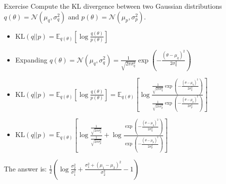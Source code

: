 \documentclass{beamer}
\begin{document}
\begin{frame}{Exercise}
    Compute the KL divergence between two Gaussian distributions $q(\theta) = \mathcal{N}(\mu_q, \sigma_q^2)$ and $p(\theta) = \mathcal{N}(\mu_p, \sigma_p^2)$.

    \begin{itemize}
        \item \pause $\text{KL}(q||p) = \mathbb{E}_{q(\theta)} \left[ \log \frac{q(\theta)}{p(\theta)} \right]$
        \item \pause Expanding $q(\theta) = \mathcal{N}(\mu_q, \sigma_q^2) = \frac{1}{\sqrt{2\pi\sigma_q^2}} \exp \left( -\frac{(\theta - \mu_q)^2}{2\sigma_q^2} \right)$
        \item \pause $\text{KL}(q||p) = \mathbb{E}_{q(\theta)} \left[ \log \frac{q(\theta)}{p(\theta)} \right] = \mathbb{E}_{q(\theta)} \left[ \log \frac{\frac{1}{\sqrt{2\pi\sigma_q^2}} \exp \left( -\frac{(\theta - \mu_q)^2}{2\sigma_q^2} \right)}{\frac{1}{\sqrt{2\pi\sigma_p^2}} \exp \left( -\frac{(\theta - \mu_p)^2}{2\sigma_p^2} \right)} \right]$
        \item \pause $\text{KL}(q||p) = \mathbb{E}_{q(\theta)} \left[ \log \frac{\frac{1}{\sqrt{2\pi\sigma_q^2}}}{\frac{1}{\sqrt{2\pi\sigma_p^2}}} + \log \frac{\exp \left( -\frac{(\theta - \mu_q)^2}{2\sigma_q^2} \right)}{\exp \left( -\frac{(\theta - \mu_p)^2}{2\sigma_p^2} \right)} \right]$
    \end{itemize}

    \pause The answer is: $\frac{1}{2} \left( \log \frac{\sigma_2^2}{\sigma_1^2} + \frac{\sigma_1^2 + (\mu_1 - \mu_2)^2}{\sigma_2^2} - 1 \right)$
    
\end{frame}
\end{document}
